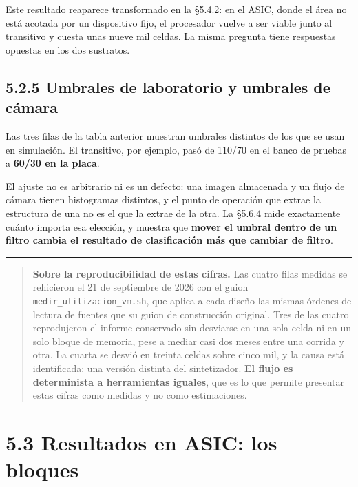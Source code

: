 Este resultado reaparece transformado en la §5.4.2: en el ASIC, donde el
área no está acotada por un dispositivo fijo, el procesador vuelve a ser
viable junto al transitivo y cuesta unas nueve mil celdas. La misma
pregunta tiene respuestas opuestas en los dos sustratos.

\subsection{5.2.5 Umbrales de laboratorio y umbrales de
cámara}\label{umbrales-de-laboratorio-y-umbrales-de-cuxe1mara}

Las tres filas de la tabla anterior muestran umbrales distintos de los
que se usan en simulación. El transitivo, por ejemplo, pasó de 110/70 en
el banco de pruebas a \textbf{60/30 en la placa}.

El ajuste no es arbitrario ni es un defecto: una imagen almacenada y un
flujo de cámara tienen histogramas distintos, y el punto de operación
que extrae la estructura de una no es el que la extrae de la otra. La
§5.6.4 mide exactamente cuánto importa esa elección, y muestra que
\textbf{mover el umbral dentro de un filtro cambia el resultado de
clasificación más que cambiar de filtro}.

\begin{center}\rule{0.5\linewidth}{0.5pt}\end{center}

\begin{quote}
\textbf{Sobre la reproducibilidad de estas cifras.} Las cuatro filas
medidas se rehicieron el 21 de septiembre de 2026 con el guion
\texttt{medir\_utilizacion\_vm.sh}, que aplica a cada diseño las mismas
órdenes de lectura de fuentes que su guion de construcción original.
Tres de las cuatro reprodujeron el informe conservado sin desviarse en
una sola celda ni en un solo bloque de memoria, pese a mediar casi dos
meses entre una corrida y otra. La cuarta se desvió en treinta celdas
sobre cinco mil, y la causa está identificada: una versión distinta del
sintetizador. \textbf{El flujo es determinista a herramientas iguales},
que es lo que permite presentar estas cifras como medidas y no como
estimaciones.
\end{quote}

\section{5.3 Resultados en ASIC: los
bloques}\label{resultados-en-asic-los-bloques}

